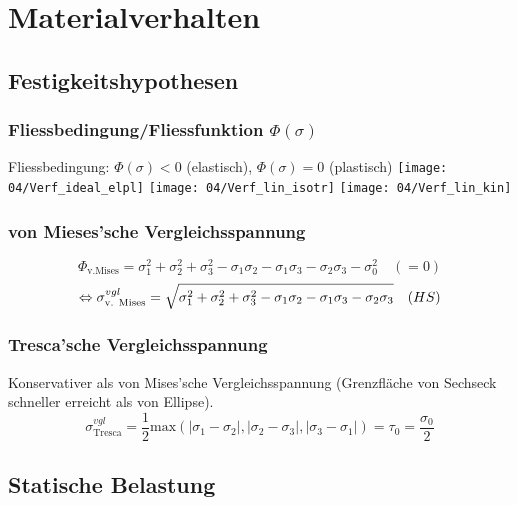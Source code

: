 \section{Materialverhalten}{}
    \subsection{Festigkeitshypothesen}
        \subsubsection{Fliessbedingung/Fliessfunktion $\Phi(\sigma)$}
            Fliessbedingung: $\Phi(\sigma)<0$ (elastisch), $\Phi(\sigma)=0$ (plastisch)
            \texttt{[image: 04/Verf\_ideal\_elpl]}
            \texttt{[image: 04/Verf\_lin\_isotr]}
            \texttt{[image: 04/Verf\_lin\_kin]}
        \subsubsection{von Mieses'sche Vergleichsspannung}
            \vspace{-3mm}
            \[\Phi_{\textrm{v.Mises}}= \sigma_1^2+\sigma_2^2+\sigma_3^2-\sigma_1\sigma_2-\sigma_1\sigma_3-\sigma_2\sigma_3 -\sigma_0^2\quad(=0)\]
            \[\Leftrightarrow \sigma_{\textrm{v. Mises}}^{vgl}= \sqrt{\sigma_1^2+\sigma_2^2+\sigma_3^2-\sigma_1\sigma_2-\sigma_1\sigma_3-\sigma_2\sigma_3} \quad\textrm(HS)\]
        \subsubsection{Tresca'sche Vergleichsspannung}
            Konservativer als von Mises'sche Vergleichsspannung (Grenzfläche von Sechseck schneller erreicht als von Ellipse).
            \[\sigma_{\textrm{Tresca}}^{vgl}=\frac{1}{2}\textrm{max} \left(|\sigma_1-\sigma_2|,|\sigma_2-\sigma_3|,|\sigma_3-\sigma_1| \right) =\tau_0=\frac{\sigma_0}{2}\]
    \subsection{Statische Belastung}
        \begin{comment}
            \subsubsection{Kraft- \& Deformationsgesteurete Belastung:}
            $\frac{\varepsilon_b}{\varepsilon_0}$ Deformationsgesteurete Belastung. Bsp vorgespannte Schraube, therm Spannungen. Begrenzung weniger konservativ $\sigma\varepsilon$-Diagramm gr Dehnung führt zu nur kl Spannungserhöhung).\\ $\frac{\sigma_B}{\sigma_0}$ Kraftgesteuerte Belastung. (Für viele Metalle $\frac{\varepsilon_b}{\varepsilon_0} \gg \frac{\sigma_B}{\sigma_0}$) Überschreiten $R_{p0.2}$ weniger Reserve.
        \end{comment}
